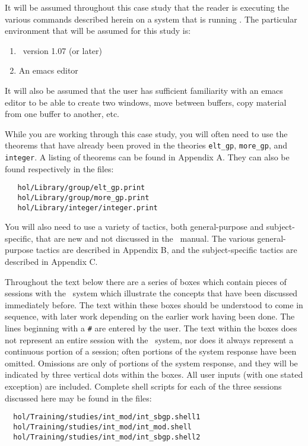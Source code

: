 It will be assumed throughout this case study that the reader is
executing the various commands described herein on a system that is
running \HOL.  The particular environment that will be assumed for
this study is:
\begin{enumerate}
\item \HOL\ version 1.07 (or later)
\item An emacs editor
\end{enumerate}
It will also be assumed that the user has sufficient familiarity with
an emacs editor to be able to create two windows, move between buffers,
copy material from one buffer to another, etc.

While you are working through this case study, you will often need to
use the theorems that have already been proved in the theories
{\small\verb+elt_gp+}, {\small\verb+more_gp+}, and
{\small\verb+integer+}.  A listing of theorems can be found in
Appendix A. They can also be found respectively in the files:
\begin{verbatim}
   hol/Library/group/elt_gp.print
   hol/Library/group/more_gp.print
   hol/Library/integer/integer.print
\end{verbatim}
You will also need to use a variety of tactics, both general-purpose
and subject-specific, that are new and not discussed in the \HOL\
manual.  The various general-purpose tactics are described in Appendix
B, and the subject-specific tactics are described in Appendix C.

Throughout the text below there are a series of boxes which contain
pieces of sessions with the \HOL\ system which illustrate the
concepts that have been discussed immediately before.  The text within
these boxes should be understood to come in sequence, with later work
depending on the earlier work having been done.  The lines beginning
with a {\small\verb+#+} are entered by the user.  The text within
the boxes does not represent an entire session with the \HOL\ system,
nor does it always represent a continuous portion of a session; often
portions of the system response have been omitted.  Omissions are only
of portions of the system response, and they will be indicated by
three vertical dots within the boxes.  All user inputs (with one
stated exception) are included.  Complete shell scripts for each
of the three sessions discussed here may be found in the files:
\begin{verbatim}
  hol/Training/studies/int_mod/int_sbgp.shell1
  hol/Training/studies/int_mod/int_mod.shell
  hol/Training/studies/int_mod/int_sbgp.shell2
\end{verbatim}

